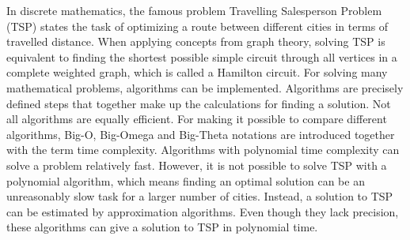 
In discrete mathematics, the famous problem Travelling Salesperson Problem (TSP) states the task of optimizing a route between different cities in terms of travelled distance. 
When applying concepts from graph theory, solving TSP is equivalent to finding the shortest possible simple circuit through all vertices in a complete weighted graph, which is called a Hamilton circuit. 
For solving many mathematical problems, algorithms can be implemented. Algorithms are precisely defined steps that together make up the calculations for finding a solution. 
Not all algorithms are equally efficient. For making it possible to compare different algorithms, Big-O, Big-Omega and Big-Theta notations are introduced together with the term time complexity. 
Algorithms with polynomial time complexity can solve a problem relatively fast. 
However, it is not possible to solve TSP with a polynomial algorithm, which means finding an optimal solution can be an unreasonably slow task for a larger number of cities. 
Instead, a solution to TSP can be estimated by approximation algorithms.
Even though they lack precision, these algorithms can give a solution to TSP in polynomial time. 
